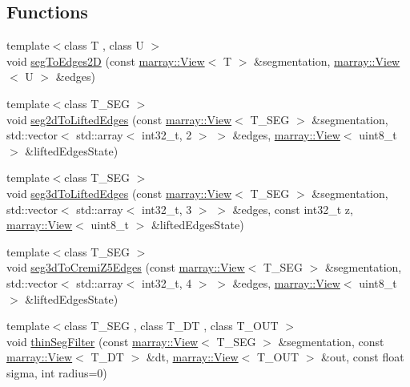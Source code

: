 \subsection*{Functions}
\begin{DoxyCompactItemize}
\item 
{\footnotesize template$<$class T , class U $>$ }\\void \hyperlink{namespacenifty_1_1ground__truth_af49d3596b8aaf59bd7dcf3163e99d08f}{seg\+To\+Edges2D} (const \hyperlink{classandres_1_1View}{marray\+::\+View}$<$ T $>$ \&segmentation, \hyperlink{classandres_1_1View}{marray\+::\+View}$<$ U $>$ \&edges)
\item 
{\footnotesize template$<$class T\+\_\+\+S\+EG $>$ }\\void \hyperlink{namespacenifty_1_1ground__truth_af4ff3155dceef94452c198adb989d21e}{seg2d\+To\+Lifted\+Edges} (const \hyperlink{classandres_1_1View}{marray\+::\+View}$<$ T\+\_\+\+S\+EG $>$ \&segmentation, std\+::vector$<$ std\+::array$<$ int32\+\_\+t, 2 $>$ $>$ \&edges, \hyperlink{classandres_1_1View}{marray\+::\+View}$<$ uint8\+\_\+t $>$ \&lifted\+Edges\+State)
\item 
{\footnotesize template$<$class T\+\_\+\+S\+EG $>$ }\\void \hyperlink{namespacenifty_1_1ground__truth_a6d7ab1dca0ac9229967b736100609112}{seg3d\+To\+Lifted\+Edges} (const \hyperlink{classandres_1_1View}{marray\+::\+View}$<$ T\+\_\+\+S\+EG $>$ \&segmentation, std\+::vector$<$ std\+::array$<$ int32\+\_\+t, 3 $>$ $>$ \&edges, const int32\+\_\+t z, \hyperlink{classandres_1_1View}{marray\+::\+View}$<$ uint8\+\_\+t $>$ \&lifted\+Edges\+State)
\item 
{\footnotesize template$<$class T\+\_\+\+S\+EG $>$ }\\void \hyperlink{namespacenifty_1_1ground__truth_a9db1e8161597359400b066deab0f7dfb}{seg3d\+To\+Cremi\+Z5\+Edges} (const \hyperlink{classandres_1_1View}{marray\+::\+View}$<$ T\+\_\+\+S\+EG $>$ \&segmentation, std\+::vector$<$ std\+::array$<$ int32\+\_\+t, 4 $>$ $>$ \&edges, \hyperlink{classandres_1_1View}{marray\+::\+View}$<$ uint8\+\_\+t $>$ \&lifted\+Edges\+State)
\item 
{\footnotesize template$<$class T\+\_\+\+S\+EG , class T\+\_\+\+DT , class T\+\_\+\+O\+UT $>$ }\\void \hyperlink{namespacenifty_1_1ground__truth_a4feb2d90b357085dcc776da2e24a4f64}{thin\+Seg\+Filter} (const \hyperlink{classandres_1_1View}{marray\+::\+View}$<$ T\+\_\+\+S\+EG $>$ \&segmentation, const \hyperlink{classandres_1_1View}{marray\+::\+View}$<$ T\+\_\+\+DT $>$ \&dt, \hyperlink{classandres_1_1View}{marray\+::\+View}$<$ T\+\_\+\+O\+UT $>$ \&out, const float sigma, int radius=0)
\end{DoxyCompactItemize}


